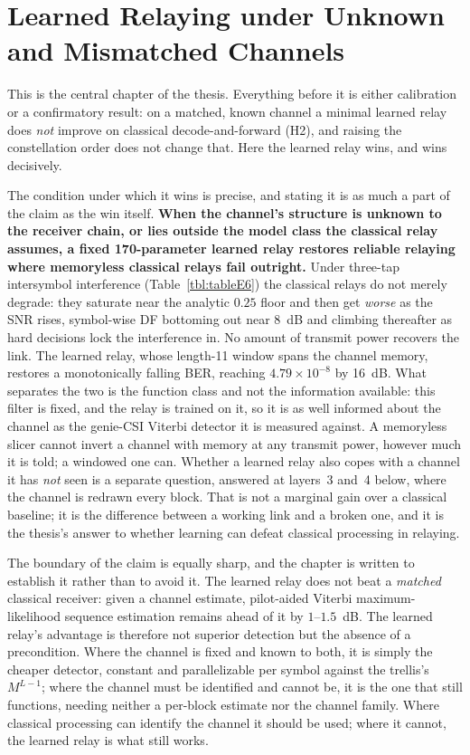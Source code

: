 \chapter{Learned Relaying under Unknown and Mismatched Channels}\label{sec:unknown-channels}

This is the central chapter of the thesis. Everything before it is either calibration or a confirmatory result: on a matched, known channel a minimal learned relay does \emph{not} improve on classical decode-and-forward (H2), and raising the constellation order does not change that. Here the learned relay wins, and wins decisively.

The condition under which it wins is precise, and stating it is as much a part of the claim as the win itself. \textbf{When the channel's structure is unknown to the receiver chain, or lies outside the model class the classical relay assumes, a fixed 170-parameter learned relay restores reliable relaying where memoryless classical relays fail outright.} Under three-tap intersymbol interference (Table~\ref{tbl:tableE6}) the classical relays do not merely degrade: they saturate near the analytic $0.25$ floor and then get \emph{worse} as the SNR rises, symbol-wise DF bottoming out near 8~dB and climbing thereafter as hard decisions lock the interference in. No amount of transmit power recovers the link. The learned relay, whose length-11 window spans the channel memory, restores a monotonically falling BER, reaching $4.79\times10^{-8}$ by 16~dB. What separates the two is the function class and not the information available: this filter is fixed, and the relay is trained on it, so it is as well informed about the channel as the genie-CSI Viterbi detector it is measured against. A memoryless slicer cannot invert a channel with memory at any transmit power, however much it is told; a windowed one can. Whether a learned relay also copes with a channel it has \emph{not} seen is a separate question, answered at layers~3 and~4 below, where the channel is redrawn every block. That is not a marginal gain over a classical baseline; it is the difference between a working link and a broken one, and it is the thesis's answer to whether learning can defeat classical processing in relaying.

The boundary of the claim is equally sharp, and the chapter is written to establish it rather than to avoid it. The learned relay does not beat a \emph{matched} classical receiver: given a channel estimate, pilot-aided Viterbi maximum-likelihood sequence estimation remains ahead of it by $1$--$1.5$~dB. The learned relay's advantage is therefore not superior detection but the absence of a precondition. Where the channel is fixed and known to both, it is simply the cheaper detector, constant and parallelizable per symbol against the trellis's $M^{L-1}$; where the channel must be identified and cannot be, it is the one that still functions, needing neither a per-block estimate nor the channel family. Where classical processing can identify the channel it should be used; where it cannot, the learned relay is what still works.

